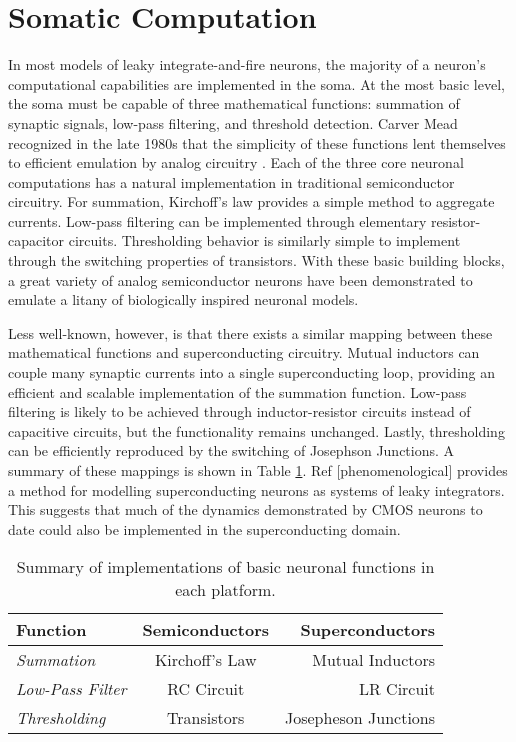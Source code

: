 \documentclass{article}
\begin{document}
\section{Somatic Computation}
\quad In most models of leaky integrate-and-fire neurons, the majority of a neuron's computational capabilities are implemented in the soma. At the most basic level, the soma must be capable of three mathematical functions: summation of synaptic signals, low-pass filtering, and threshold detection. Carver Mead recognized in the late 1980s that the simplicity of these functions lent themselves to efficient emulation by analog circuitry \cite{mead1990neuromorphic}. Each of the three core neuronal computations has a natural implementation in traditional semiconductor circuitry. For summation, Kirchoff's law provides a simple method to aggregate currents. Low-pass filtering can be implemented through elementary resistor-capacitor circuits. Thresholding behavior is similarly simple to implement through the switching properties of transistors. With these basic building blocks, a great variety of analog semiconductor neurons have been demonstrated to emulate a litany of biologically inspired neuronal models.

Less well-known, however, is that there exists a similar mapping between these mathematical functions and superconducting circuitry. Mutual inductors can couple many synaptic currents into a single superconducting loop, providing an efficient and scalable implementation of the summation function. Low-pass filtering is likely to be achieved through inductor-resistor circuits instead of capacitive circuits, but the functionality remains unchanged. Lastly, thresholding can be efficiently reproduced by the switching of Josephson Junctions.  A summary of these mappings is shown in Table \ref{tab:mathtable}. Ref [phenomenological] provides a method for modelling superconducting neurons as systems of leaky integrators. This suggests that much of the dynamics demonstrated by CMOS neurons to date could also be implemented in the superconducting domain.

\begin{table}[h!]
  \begin{center}
    \label{tab:mathtable}
    \begin{tabular}{l|c|r} %
      \textbf{Function} & \textbf{Semiconductors} & \textbf{Superconductors}\\
      \hline
      \textit{Summation} & Kirchoff's Law & Mutual Inductors\\
      \textit{Low-Pass Filter} & RC Circuit & LR Circuit\\
      \textit{Thresholding} & Transistors & Josepheson Junctions\\
    \end{tabular}
    \caption{Summary of implementations of basic neuronal functions in each platform.}
  \end{center}
\end{table}
\end{document}
